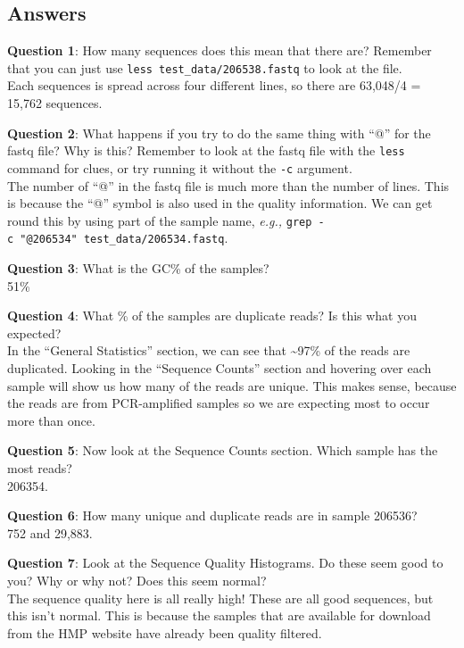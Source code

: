 \documentclass[
]{book}
\begin{document}
\subsection{Answers}\label{answers}

\textbf{Question 1}: How many sequences does this mean that there are? Remember that you can just use \texttt{less\ test\_data/206538.fastq} to look at the file.\\
Each sequences is spread across four different lines, so there are 63,048/4 = 15,762 sequences.

\textbf{Question 2}: What happens if you try to do the same thing with ``@'' for the fastq file? Why is this? Remember to look at the fastq file with the \texttt{less} command for clues, or try running it without the \texttt{-c} argument.\\
The number of ``@'' in the fastq file is much more than the number of lines. This is because the ``@'' symbol is also used in the quality information. We can get round this by using part of the sample name, \emph{e.g.,} \texttt{grep\ -c\ "@206534"\ test\_data/206534.fastq}.

\textbf{Question 3}: What is the GC\% of the samples?\\
51\%

\textbf{Question 4}: What \% of the samples are duplicate reads? Is this what you expected?\\
In the ``General Statistics'' section, we can see that \textasciitilde97\% of the reads are duplicated. Looking in the ``Sequence Counts'' section and hovering over each sample will show us how many of the reads are unique. This makes sense, because the reads are from PCR-amplified samples so we are expecting most to occur more than once.

\textbf{Question 5}: Now look at the Sequence Counts section. Which sample has the most reads?\\
206354.

\textbf{Question 6}: How many unique and duplicate reads are in sample 206536?\\
752 and 29,883.

\textbf{Question 7}: Look at the Sequence Quality Histograms. Do these seem good to you? Why or why not? Does this seem normal?\\
The sequence quality here is all really high! These are all good sequences, but this isn't normal. This is because the samples that are available for download from the HMP website have already been quality filtered.
\end{document}
